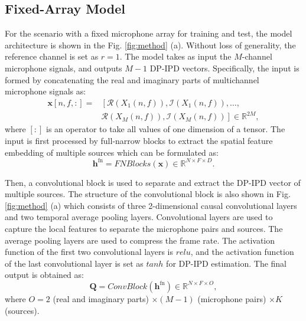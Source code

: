 \documentclass[lettersize,journal]{IEEEtran}
\begin{document}
\subsection{Fixed-Array Model}
For the scenario with a fixed microphone array for training and test, the model architecture is shown in the Fig. \ref{fig:method} (a). Without loss of generality, the reference channel is set as $r=1$. The model takes as input the $M$-channel microphone signals, and  outputs $M-1$ DP-IPD vectors. Specifically, the input is formed by concatenating the real and imaginary parts of multichannel microphone signals as:
\begin{equation}\label{input}
\begin{aligned}
\mathbf{x}[n, f,:]=&\left[ \mathcal{R}\left(X_1(n, f)\right), \mathcal{I}\left(X_1(n, f)\right), \ldots,\right. \\
&\left.\mathcal{R}\left(X_M(n, f)\right), \mathcal{I}\left(X_M(n, f)\right)\right] \in \mathbb{R}^{2 M},
\end{aligned}
\end{equation}
where $[:]$ is an operator to take all values of one dimension of a tensor. 
The input is first processed by full-narrow blocks to extract the spatial feature embedding of multiple sources which can be formulated as:
\begin{equation}
    \mathbf{h}^{\text{fn}} = FNBlocks(\mathbf{x})\in \mathbb{R}^{N\times F \times D}.
\end{equation}

Then, a convolutional block is used to separate and extract the DP-IPD vector of multiple sources. The structure of the convolutional block is also shown in Fig. \ref{fig:method} (a) which consists of three 2-dimensional causal convolutional layers and two temporal average pooling layers. Convolutional layers are used to capture the local features to separate the microphone pairs and sources. The average pooling layers are used to compress the frame rate.
The activation function of the first two convolutional layers is $relu$, and the activation function of the last convolutional layer is set as $tanh$ for DP-IPD estimation. The final output is obtained as:
\begin{equation}
    \mathbf{Q} = ConvBlock(\mathbf{h}^{\text{fn}})\in \mathbb{R}^{N\times F \times O},
\end{equation}
where $O=2$ (real and imaginary parts) $\times (M-1)$ (microphone pairs) $\times K$ (sources). 
\end{document}

